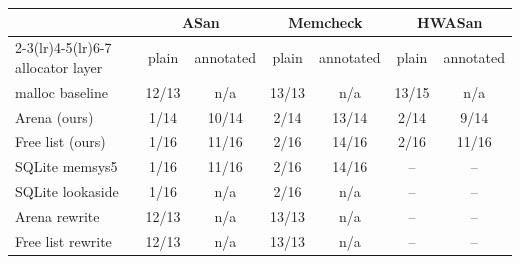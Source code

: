 \begin{tabular}{l*{3}{cc}}
\toprule
 & \multicolumn{2}{c}{ASan} & \multicolumn{2}{c}{Memcheck} & \multicolumn{2}{c}{HWASan} \\
\cmidrule(lr){2-3}\cmidrule(lr){4-5}\cmidrule(lr){6-7}
allocator layer & plain & annotated & plain & annotated & plain & annotated \\
\midrule
malloc baseline & 12/13 & n/a & 13/13 & n/a & 13/15 & n/a \\
Arena (ours) & 1/14 & 10/14 & 2/14 & 13/14 & 2/14 & 9/14 \\
Free list (ours) & 1/16 & 11/16 & 2/16 & 14/16 & 2/16 & 11/16 \\
SQLite memsys5 & 1/16 & 11/16 & 2/16 & 14/16 & -- & -- \\
SQLite lookaside & 1/16 & n/a & 2/16 & n/a & -- & -- \\
Arena rewrite & 12/13 & n/a & 13/13 & n/a & -- & -- \\
Free list rewrite & 12/13 & n/a & 13/13 & n/a & -- & -- \\
\bottomrule
\end{tabular}
